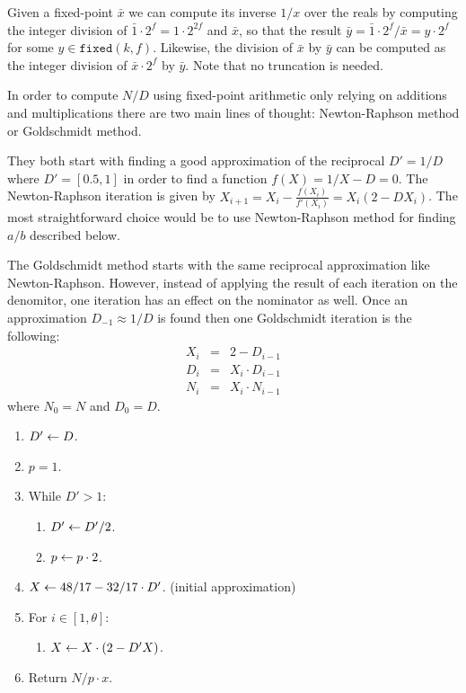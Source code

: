 Given a fixed-point $\bar{x}$ we can compute its inverse $1/x$ over the reals by
computing the integer division of $\bar{1} \cdot 2^f = 1 \cdot 2^{2f}$ and $\bar{x}$,
so that the result $\bar{y} = \bar{1} \cdot 2^f / \bar{x} = y \cdot 2^f$ for some
$y \in \mathtt{fixed}(k, f)$. Likewise, the division of $\bar{x}$ by $\bar{y}$ can
be computed as the integer division of $\bar{x} \cdot 2^f$ by $\bar{y}$. Note that
no truncation is needed.

In order to compute $N/D$ using fixed-point arithmetic only relying on additions
and multiplications there are two main lines of thought: Newton-Raphson method
or Goldschmidt method.

They both start with finding a good approximation of the reciprocal $D' = 1/D$
where $D' = [0.5, 1]$ in order to find a function $f(X) = 1/X - D = 0$. The
Newton-Raphson iteration is given by $X_{i+1} = X_i - \frac{f(X_i)}{f'(X_i)} =
X_i(2 - DX_i)$. The most straightforward choice would be to use Newton-Raphson
method for finding $a/b$ described below.

The Goldschmidt method starts with the same reciprocal approximation like
Newton-Raphson. However, instead of applying the result of each iteration on the
denomitor, one iteration has an effect on the nominator as well.  Once an
approximation $D_{-1} \approx 1/D$ is found then one Goldschmidt iteration is the
following:
\begin{eqnarray*}
X_i &=& 2 - D_{i-1} \\
D_i &=& X_i \cdot D_{i-1} \\
N_i &=& X_i \cdot N_{i-1}
\end{eqnarray*}
where $N_0 = N$ and $D_0 = D$.

\begin{enumerate}
  \item $D' \gets D$.
  \item $p = 1$.
  \item While $D' > 1$:
  \begin{enumerate}
    \item $D' \gets D' / 2$.
    \item $p \gets p \cdot 2$.
  \end{enumerate}
  \item $X \gets 48/17 - 32/17 \cdot D'$. (initial approximation)
  \item For $i \in [1, \theta]$:
  \begin{enumerate}
      \item $X \gets X \cdot (2 - D'X)$.
  \end{enumerate}
  \item Return $N / p \cdot x$.
\end{enumerate}


